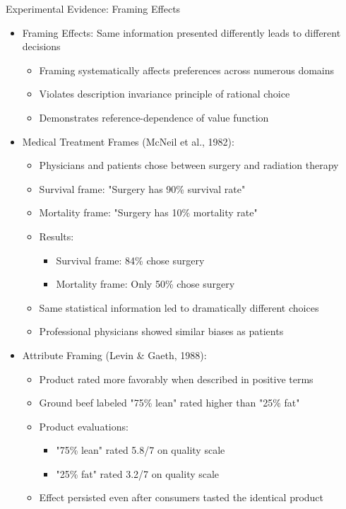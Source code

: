 \documentclass[10pt]{beamer}
\begin{document}
\begin{frame}{Experimental Evidence: Framing Effects}
  \begin{itemize}[<+->]
    \item Framing Effects: Same information presented differently leads to different decisions
      \begin{itemize}
        \item Framing systematically affects preferences across numerous domains
        \item Violates description invariance principle of rational choice
        \item Demonstrates reference-dependence of value function
      \end{itemize}
    \item Medical Treatment Frames (McNeil et al., 1982):
      \begin{itemize}
        \item Physicians and patients chose between surgery and radiation therapy
        \item Survival frame: "Surgery has 90\% survival rate"
        \item Mortality frame: "Surgery has 10\% mortality rate"
        \item Results:
          \begin{itemize}
            \item Survival frame: 84\% chose surgery
            \item Mortality frame: Only 50\% chose surgery
          \end{itemize}
        \item Same statistical information led to dramatically different choices
        \item Professional physicians showed similar biases as patients
      \end{itemize}
    \item Attribute Framing (Levin \& Gaeth, 1988):
      \begin{itemize}
        \item Product rated more favorably when described in positive terms
        \item Ground beef labeled "75\% lean" rated higher than "25\% fat"
        \item Product evaluations: 
          \begin{itemize}
            \item "75\% lean" rated 5.8/7 on quality scale
            \item "25\% fat" rated 3.2/7 on quality scale
          \end{itemize}
        \item Effect persisted even after consumers tasted the identical product
      \end{itemize}
  \end{itemize}
\end{frame}
\end{document}
